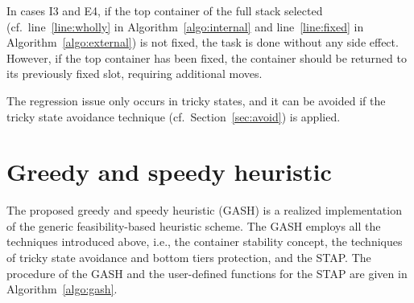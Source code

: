 \documentclass[review,3p,times,12pt,number]{elsarticle}\usepackage{amsmath}\usepackage{amssymb}
\begin{document}
In cases I3 and E4, if the top container of the full stack selected (cf.\ line~\ref{line:wholly} in Algorithm~\ref{algo:internal} and line~\ref{line:fixed} in Algorithm~\ref{algo:external}) is not fixed, the task is done without any side effect. However, if the top container has been fixed, the container should be returned to its previously fixed slot, requiring additional moves.

The regression issue only occurs in tricky states, and it can be avoided if the tricky state avoidance technique (cf.\ Section~\ref{sec:avoid}) is applied.



\section{Greedy and speedy heuristic}

\label{sec:gash}


The proposed {greedy and speedy heuristic} (GASH) is a realized implementation of the generic feasibility-based heuristic scheme. 
The GASH employs all the techniques introduced above, i.e., the container stability concept, the techniques of tricky state avoidance and bottom tiers protection, and the STAP\@. The procedure of the GASH and the user-defined functions for the STAP are given in Algorithm~\ref{algo:gash}.
\end{document}
